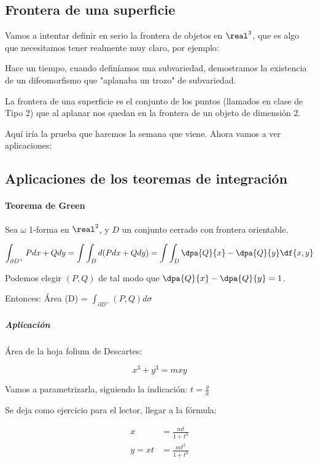 \subsection{Frontera de una superficie}
Vamos a intentar definir en serio la frontera de objetos en $\real^3$, que es algo que necesitamos tener realmente muy claro, por ejemplo:


Hace un tiempo, cuando definíamos una subvariedad, demostramos la existencia de un difeomorfismo que "aplanaba un trozo" de subvariedad. 

La frontera de una superficie es el conjunto de los puntos (llamados en clase de Tipo 2) que al aplanar nos quedan en la frontera de un objeto de dimensión 2.

Aquí iría la prueba que haremos la semana que viene. Ahora vamos a ver aplicaciones:


\subsection{Aplicaciones de los teoremas de integración}
\paragraph{Teorema de Green}
Sea $\omega$ 1-forma en $\real^2$, y $D$ un conjunto cerrado con frontera orientable.

\[
\int_{\partial  D^+} Pdx+Qdy = \int \int_D d(Pdx+Qdy) = \int\int_D \dpa{Q}{x} - \dpa{Q}{y}\df{x,y}
\]

\obs Podemos elegir $(P,Q)$ de tal modo que $\displaystyle \dpa{Q}{x}-\dpa{Q}{y} = 1$.

Entonces: Área (D) = $\displaystyle\int_{\partial  D^+} (P,Q)d\sigma$

\subparagraph{Aplicación} Área de la hoja folium de Descartes:

\[x^3+y^3 = mxy\]



Vamos a parametrizarla, siguiendo la indicación: $t = \frac{y}{x}$

Se deja como ejercicio para el lector, llegar a la fórmula:

\[\begin{array}{cc}
x&=\displaystyle\frac{mt}{1+t^3}\\
y= xt &= \displaystyle\frac{mt^2}{1+t^3}
\end{array}\]

